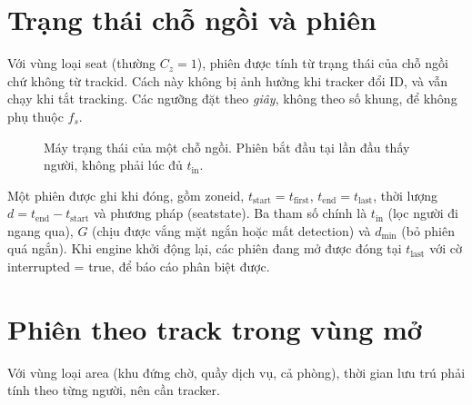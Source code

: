 \documentclass[10pt,a4paper,oneside,openany]{report}
\newcommand{\breakus}{\textunderscore\allowbreak}
\newcommand{\code}[1]{{\ttfamily\let\_\breakus #1}}
\begin{document}
\section{Trạng thái chỗ ngồi và phiên}\label{sec:ghe}
Với vùng loại \code{seat} (thường $C_z = 1$), phiên được tính từ trạng thái của chỗ ngồi chứ không từ \code{track\_id}.
Cách này không bị ảnh hưởng khi tracker đổi ID, và vẫn chạy khi tắt tracking. Các ngưỡng đặt theo \emph{giây}, không theo số khung,
để không phụ thuộc $f_s$.

\begin{figure}[H]
\centering
{}
\caption{Máy trạng thái của một chỗ ngồi. Phiên bắt đầu tại lần đầu thấy người, không phải lúc đủ $t_{\text{in}}$.}
\label{fig:seatfsm}
\end{figure}

Một phiên được ghi khi đóng, gồm \code{zone\_id}, $t_{\text{start}} = t_{\text{first}}$, $t_{\text{end}} = t_{\text{last}}$,
thời lượng $d = t_{\text{end}} - t_{\text{start}}$ và phương pháp (\code{seat\_state}). Ba tham số chính là
$t_{\text{in}}$ (lọc người đi ngang qua), $G$ (chịu được vắng mặt ngắn hoặc mất detection) và $d_{\min}$ (bỏ phiên quá ngắn).
Khi engine khởi động lại, các phiên đang mở được đóng tại $t_{\text{last}}$ với cờ \code{interrupted = true}, để báo cáo phân biệt được.

\section{Phiên theo track trong vùng mở}\label{sec:noitrack}
Với vùng loại \code{area} (khu đứng chờ, quầy dịch vụ, cả phòng), thời gian lưu trú phải tính theo từng người, nên cần tracker.
\end{document}
